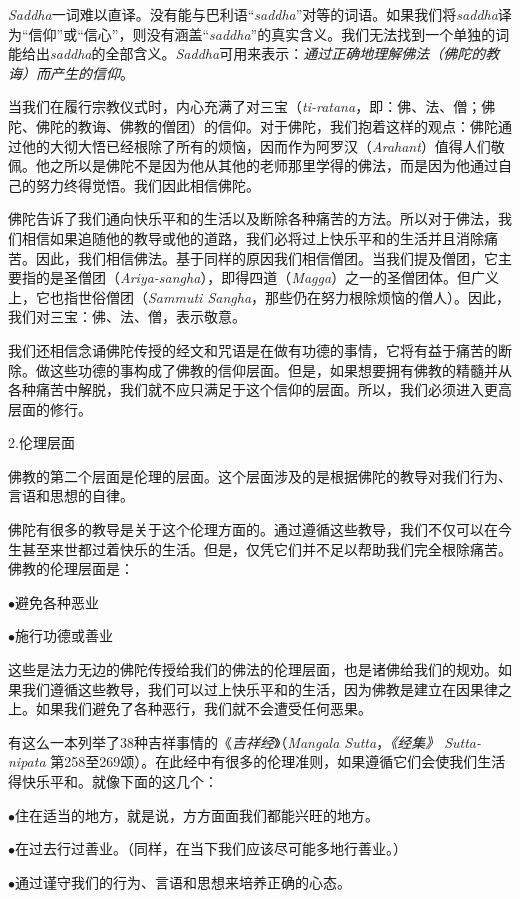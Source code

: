 {\it Saddha}一词难以直译。没有能与巴利语“{\it saddha}”对等的词语。如果我们将{\it saddha}译为“信仰”或“信心”，则没有涵盖“{\it saddha}”的真实含义。我们无法找到一个单独的词能给出{\it saddha}的全部含义。{\it Saddha}可用来表示：{\it 通过正确地\1理解佛法（佛陀的教诲）而产生的信仰}。

当我们在履行宗教仪式时，内心充满了对三宝（{\it ti-ratana}，即：佛、法、僧；佛陀、佛陀的教诲、佛教的僧团）的信仰。对于佛陀，我们抱着这样的观点：佛陀通过他的大彻大悟已经根除了所有的烦恼，因而作为阿罗汉（{\it Arahant}）值得人们敬佩。他之所以是佛陀不是因为他从其他的老师那里学得的佛法，而是因为他通过自己的努力终得觉悟。我们因此相信佛陀。

佛陀告诉了我们通向快乐平和的生活以及断除各种痛苦的方法。所以对于佛法，我们相信如果追随他的教导或他的道路，我们必将过上快乐平和的生活并且消除痛苦。因此，我们相信佛法。基于同样的原因我们相信僧团。当我们提及僧团，它主要指的是圣僧团（{\it Ariya-sangha}），即得四道（{\it Magga}）之一的圣僧团体。但广义上，它也指世俗僧团（{\it Sammuti Sangha}，那些仍在努力根除烦恼的僧人）。因此，我们对三宝：佛、法、僧，表示敬意。

我们还相信念诵佛陀传授的经文和咒语是在做有功德的事情，它将有益于痛苦的断除。做这些功德的事构成了佛教的信仰层面。但是，如果想要拥有佛教的精髓并\1从各种痛苦中解脱，我们就不应只满足于这个信仰的层面。所以，我们必须进入更高层面的修行。

\sssubsectnon 2.伦理层面

佛教的第二个层面是伦理的层面。这个层面涉及的是根据佛陀的教导对我们行为、言语和思想的自律。

佛陀有很多的教导是关于这个伦理方面的。通过遵循这些教导，我们不仅可以在今生甚至来世都过着快乐的生活。但是，仅凭它们并不足以帮助我们完全根除痛苦。佛教的伦理层面是：

{
\leftskip=1.6pc
\item{$\bullet$}避免各种恶业
\item{$\bullet$}施行功德或善业

}

这些是法力无边的佛陀传授给我们的佛法的伦理层面，也是诸佛给我们的规劝。如果我们遵循这些教导，我们可以过上快乐平和的生活，因为佛教是建立在因果律之上。如果我们避免了各种恶行，我们就不会遭受任何恶果。

有这么一本列举了38种吉祥事情的《{\it 吉祥经}》（{\it Mangala Sutta}，{\it 《经集》 Sutta-nipata } 第258至269颂）。在此经中有很多的伦理准则，如果遵循它们会使我们生活得快乐平和。就像下面的这几个：

{
\leftskip=1.6pc
\item{$\bullet$}住在适当的地方，就是说，方方面面我们都能兴旺的地方。
\item{$\bullet$}在过去行过善业。（同样，在当下我们应该尽可能多地行善业。）
\item{$\bullet$}通过谨守我们的行为、言语和思想来培养正确的心态。

}

